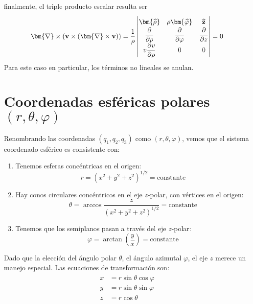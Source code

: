 finalmente, el triple producto escalar resulta ser
\[ \bm{\nabla} \times ( \mathbf{v} \times (\bm{\nabla} \times \mathbf{v})) = \dfrac{1}{\rho} \left| 
\renewcommand\arraystretch{1.5} \begin{matrix}
\bm{\widehat{\rho}} & \rho \bm{\widehat{\varphi}} & \mathbf{\widehat{z}} \\
\dfrac{\partial}{\partial \rho} & \dfrac{\partial}{\partial \varphi} & \dfrac{\partial}{\partial z} \\
v \dfrac{\partial v}{\partial \rho} & 0 & 0\end{matrix} \right| = 0 \]
Para este caso en particular, los términos no lineales se anulan. 
\section{Coordenadas esféricas polares $(r,\theta, \varphi)$}
Renombrando las coordenadas $(q_{1},q_{2},q_{3})$ como $(r, \theta, \varphi)$, vemos que el sistema coordenado esférico es consistente con:
\begin{enumerate}
\item Tenemos esferas concéntricas en el origen:
\[ r = (x^{2} + y^{2} + z^{2})^{1/2} =  \text{constante} \]
\item Hay conos circulares concéntricos en el eje $z$-polar, con vértices en el origen:
\[ \theta = \arccos \dfrac{z}{(x^{2} +y^{2} + z^{2})^{1/2}} = \text{constante}\]
\item Tenemos que los semiplanos pasan a través del eje $z$-polar:
\[ \varphi = \arctan\left(\dfrac{y}{x} \right) =  \text{constante}\]
\end{enumerate}
Dado que la elección del ángulo polar $\theta$, el ángulo azimutal $\varphi$, el eje $z$ merece un manejo especial. Las ecuaciones de transformación son:
\begin{eqnarray}
\begin{aligned}
x &= r \sin \theta \cos \varphi \\
y &= r \sin \theta \sin \varphi \\
z &= r \cos \theta
\end{aligned}
\end{eqnarray}
